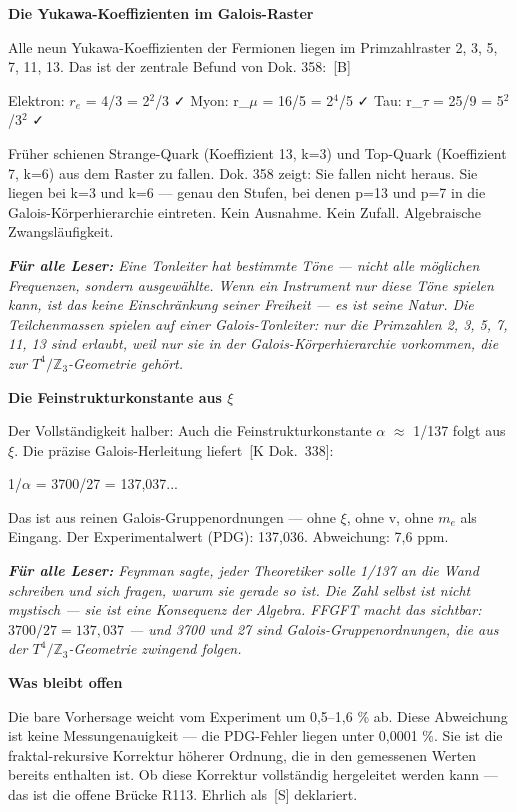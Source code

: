 \documentclass[11pt,oneside]{book}
\newcommand{\status}[1]{\penalty10000\,{\scriptsize\textcolor{gray!60}{[#1]}}}
\newenvironment{laierspur}{%
  \par\vspace{4pt}%
  \noindent\small\itshape\color{blue!60!black}%
  \textbf{Für alle Leser:}\enspace\ignorespaces}{%
  \par\vspace{4pt}\normalsize\normalfont\normalcolor}
\begin{document}
\textbf{Die Yukawa-Koeffizienten im Galois-Raster}


Alle neun Yukawa-Koeffizienten der Fermionen liegen im Primzahlraster
{2, 3, 5, 7, 11, 13}. Das ist der zentrale Befund von Dok. 358: \status{B}


Elektron: $r_e$ = 4/3 = 2$^2$/3 ✓
Myon: r\_$\mu$ = 16/5 = 2$^4$/5 ✓
Tau: r\_$\tau$ = 25/9 = 5$^2$/3$^2$ ✓


Früher schienen Strange-Quark (Koeffizient 13, k=3) und Top-Quark
(Koeffizient 7, k=6) aus dem Raster zu fallen. Dok. 358 zeigt: Sie fallen
nicht heraus. Sie liegen bei k=3 und k=6 — genau den Stufen, bei denen
p=13 und p=7 in die Galois-Körperhierarchie eintreten. Kein Ausnahme.
Kein Zufall. Algebraische Zwangsläufigkeit.


\begin{laierspur}
Eine Tonleiter hat bestimmte Töne — nicht alle möglichen
Frequenzen, sondern ausgewählte. Wenn ein Instrument nur diese Töne
spielen kann, ist das keine Einschränkung seiner Freiheit — es ist
seine Natur. Die Teilchenmassen spielen auf einer Galois-Tonleiter:
nur die Primzahlen {2, 3, 5, 7, 11, 13} sind erlaubt, weil nur sie
in der Galois-Körperhierarchie vorkommen, die zur $T^4/\mathbb{Z}_3$-Geometrie
gehört.
\end{laierspur}

\textbf{Die Feinstrukturkonstante aus $\xi$}


Der Vollständigkeit halber: Auch die Feinstrukturkonstante $\alpha$ $\approx$ 1/137
folgt aus $\xi$. Die präzise Galois-Herleitung liefert \status{K Dok.~338}:


1/$\alpha$ = 3700/27 = 137,037...


Das ist aus reinen Galois-Gruppenordnungen — ohne $\xi$, ohne v, ohne $m_e$
als Eingang. Der Experimentalwert (PDG): 137,036. Abweichung: 7,6 ppm.


\begin{laierspur}
Feynman sagte, jeder Theoretiker solle 1/137 an die Wand
schreiben und sich fragen, warum sie gerade so ist. Die Zahl selbst ist nicht
mystisch — sie ist eine Konsequenz der Algebra. FFGFT macht das sichtbar:
$3700/27 = 137{,}037$ — und 3700 und 27 sind Galois-Gruppenordnungen,
die aus der $T^4/\mathbb{Z}_3$-Geometrie zwingend folgen.
\end{laierspur}

\textbf{Was bleibt offen}


Die bare Vorhersage weicht vom Experiment um 0,5–1,6 \% ab. Diese Abweichung
ist keine Messungenauigkeit — die PDG-Fehler liegen unter 0,0001 \%. Sie ist
die fraktal-rekursive Korrektur höherer Ordnung, die in den gemessenen Werten
bereits enthalten ist. Ob diese Korrektur vollständig hergeleitet werden kann
— das ist die offene Brücke R113. Ehrlich als \status{S} deklariert.
\end{document}
